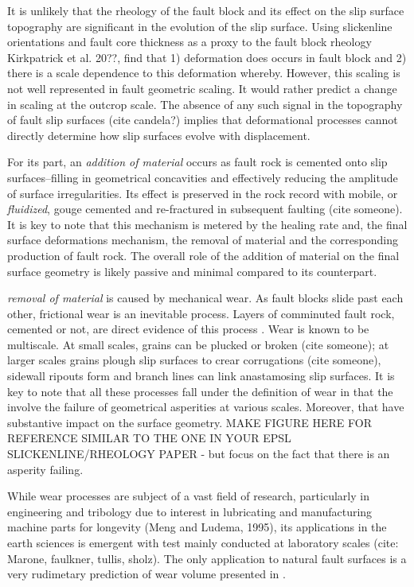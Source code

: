 \documentclass[12pt,a4paper]{article}
\begin{document}
It is unlikely that the rheology of the fault block and its effect on the slip surface topography are significant in the evolution of the slip surface. Using slickenline orientations and fault core thickness as a proxy to the fault block rheology Kirkpatrick et al. 20??, find that 1) deformation does occurs in fault block and 2) there is a scale dependence to this deformation whereby. However, this scaling is not well represented in fault geometric scaling. It would rather predict a change in scaling at the outcrop scale. The absence of any such signal in the topography of fault slip surfaces (cite candela?) implies that deformational processes cannot directly determine how slip surfaces evolve with displacement.

For its part, an \textit{addition of material} occurs as fault rock is cemented onto slip surfaces--filling in geometrical concavities and effectively reducing the amplitude of surface irregularities. Its effect is preserved in the rock record with mobile, or \textit{fluidized}, gouge cemented and re-fractured in subsequent faulting (cite someone). It is key to note that this mechanism is metered by the healing rate and, the final surface deformations mechanism, the removal of material and the corresponding production of fault rock. The overall role of the addition of material on the final surface geometry is likely passive and minimal compared to its counterpart.

\textit{removal of material} is caused by mechanical wear. As fault blocks slide past each other, frictional wear is an inevitable process. Layers of comminuted fault rock, cemented or not, are direct evidence of this process \cite{power1988roughness} \cite{scholz1987wear}. Wear is known to be multiscale. At small scales, grains can be plucked or broken (cite someone); at larger scales grains plough slip surfaces to crear corrugations (cite someone), sidewall ripouts form \cite{swanson1989sidewall} and branch lines can link anastamosing slip surfaces. It is key to note that all these processes fall under the definition of wear in that the involve the failure of geometrical asperities at various scales. Moreover, that have substantive impact on the surface geometry. MAKE FIGURE HERE FOR REFERENCE SIMILAR TO THE ONE IN YOUR EPSL SLICKENLINE/RHEOLOGY PAPER - but focus on the fact that there is an asperity failing. 

While wear processes are subject of a vast field of research, particularly in engineering and tribology due to interest in lubricating and manufacturing machine parts for longevity (Meng and Ludema, 1995), its  applications in the earth sciences is emergent with test mainly conducted at laboratory scales (cite: Marone, faulkner, tullis, sholz). The only application to natural fault surfaces is a very rudimetary prediction of wear volume presented in \cite{brodsky2011faults}.
\end{document}
